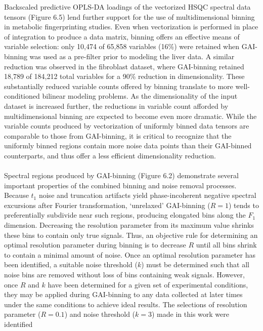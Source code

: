 \begin{doublespace}
Backscaled predictive OPLS-DA loadings of the vectorized \hcnmr{} HSQC spectral
data tensors (Figure 6.5) lend further support for the use of multidimensional
binning in metabolic fingerprinting studies. Even when vectorization is
performed in place of integration to produce a data matrix, binning offers an
effective means of variable selection: only 10,474 of 65,858 variables (16\%)
were retained when GAI-binning was used as a pre-filter prior to modeling the
liver data. A similar reduction was observed in the fibroblast dataset, where
GAI-binning retained 18,789 of 184,212 total variables for a 90\% reduction in
dimensionality. These substantially reduced variable counts offered by binning
translate to more well-conditioned bilinear modeling problems. As the
dimensionality of the input dataset is increased further, the reductions in
variable count afforded by multidimensional binning are expected to become even
more dramatic. While the variable counts produced by vectorization of uniformly
binned data tensors are comparable to those from GAI-binning, it is critical to
recognize that the uniformly binned regions contain more noise data points than
their GAI-binned counterparts, and thus offer a less efficient dimensionality
reduction.
\\\\
Spectral regions produced by GAI-binning (Figure 6.2) demonstrate several
important properties of the combined binning and noise removal processes.
Because $t_1$ noise and truncation artifacts yield phase-incoherent negative
spectral excursions after Fourier transformation, `unrelaxed' GAI-binning
($R = 1$) tends to preferentially subdivide near such regions, producing
elongated bins along the $F_1$ dimension. Decreasing the resolution parameter
from its maximum value shrinks these bins to contain only true signals. Thus,
an objective rule for determining an optimal resolution parameter during
binning is to decrease $R$ until all bins shrink to contain a minimal amount
of noise. Once an optimal resolution parameter has been identified, a suitable
noise threshold ($k$) must be determined such that all noise bins are removed
without loss of bins containing weak signals. However, once $R$ and $k$ have
been determined for a given set of experimental conditions, they may be applied
during GAI-binning to any data collected at later times under the same
conditions to achieve ideal results. The selections of resolution parameter
($R = 0.1$) and noise threshold ($k = 3$) made in this work were identified

\end{doublespace}
